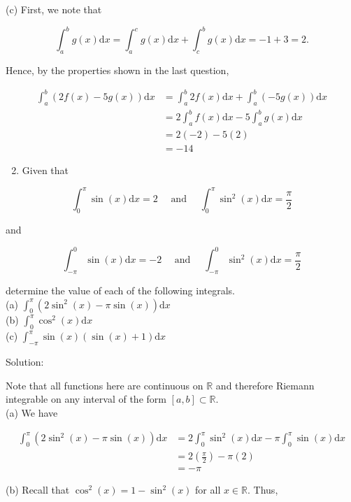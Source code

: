 \documentclass[10pt]{article}
\begin{document}
(c) First, we note that

$$
\int_{a}^{b} g(x) \mathrm{d} x=\int_{a}^{c} g(x) \mathrm{d} x+\int_{c}^{b} g(x) \mathrm{d} x=-1+3=2 .
$$

Hence, by the properties shown in the last question,

$$
\begin{aligned}
\int_{a}^{b}(2 f(x)-5 g(x)) \mathrm{d} x & =\int_{a}^{b} 2 f(x) \mathrm{d} x+\int_{a}^{b}(-5 g(x)) \mathrm{d} x \\
& =2 \int_{a}^{b} f(x) \mathrm{d} x-5 \int_{a}^{b} g(x) \mathrm{d} x \\
& =2(-2)-5(2) \\
& =-14
\end{aligned}
$$

\begin{enumerate}
  \setcounter{enumi}{1}
  \item Given that
\end{enumerate}

$$
\int_{0}^{\pi} \sin (x) \mathrm{d} x=2 \quad \text { and } \quad \int_{0}^{\pi} \sin ^{2}(x) \mathrm{d} x=\frac{\pi}{2}
$$

and

$$
\int_{-\pi}^{0} \sin (x) \mathrm{d} x=-2 \quad \text { and } \quad \int_{-\pi}^{0} \sin ^{2}(x) \mathrm{d} x=\frac{\pi}{2}
$$

determine the value of each of the following integrals.\\
(a) $\int_{0}^{\pi}\left(2 \sin ^{2}(x)-\pi \sin (x)\right) \mathrm{d} x$\\
(b) $\int_{0}^{\pi} \cos ^{2}(x) \mathrm{d} x$\\
(c) $\int_{-\pi}^{\pi} \sin (x)(\sin (x)+1) \mathrm{d} x$

Solution:

Note that all functions here are continuous on $\mathbb{R}$ and therefore Riemann integrable on any interval of the form $[a, b] \subset \mathbb{R}$.\\
(a) We have

$$
\begin{aligned}
\int_{0}^{\pi}\left(2 \sin ^{2}(x)-\pi \sin (x)\right) \mathrm{d} x & =2 \int_{0}^{\pi} \sin ^{2}(x) \mathrm{d} x-\pi \int_{0}^{\pi} \sin (x) \mathrm{d} x \\
& =2\left(\frac{\pi}{2}\right)-\pi(2) \\
& =-\pi
\end{aligned}
$$

(b) Recall that $\cos ^{2}(x)=1-\sin ^{2}(x)$ for all $x \in \mathbb{R}$. Thus,
\end{document}

